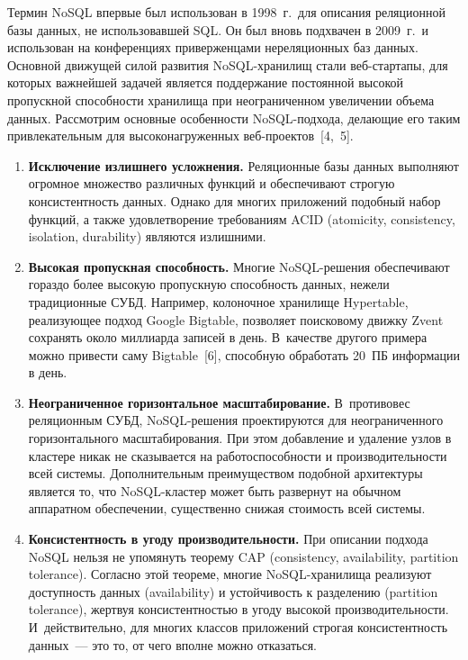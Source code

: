 \begin{multicols}{2}
   Термин NoSQL впервые был использован в 1998~г.\ для описания 
реляционной базы данных, не использовавшей SQL. Он был вновь подхвачен в 
2009~г.\ и использован на конференциях приверженцами нереляционных баз 
данных. Основной движущей силой развития NoSQL-хра\-ни\-лищ стали 
   веб-стартапы, для которых важнейшей задачей является поддержание 
постоянной высокой пропускной способности хранилища при неограниченном 
увеличении объема данных. Рассмотрим основные особенности 
   NoSQL-под\-хо\-да, делающие его таким привлекательным для 
высоконагруженных веб-про\-ек\-тов~[4,~5].
   \begin{enumerate}[1.]
\item \textbf{Исключение излишнего усложнения.} Реляционные базы 
данных выполняют огромное множество различных функций и 
обеспечивают строгую консистентность данных. Однако для многих 
приложений подобный набор функций, а также удовлетворение требованиям 
ACID (atomicity, consistency, isolation, durability)
являются излишними.
\item \textbf{Высокая пропускная способность.} Многие 
NoSQL-ре\-ше\-ния обеспечивают гораздо более высокую пропускную 
способность данных, нежели традиционные СУБД. Например, колоночное 
хранилище Hypertable, реализующее подход Google Bigtable, позволяет 
поисковому движку Zvent сохранять около миллиарда записей в день. 
В~качестве другого примера можно привести саму Bigtable~[6], способную 
обработать 20~ПБ информации в день.
\item \textbf{Неограниченное горизонтальное масштабирование.} 
В~противовес реляционным СУБД, NoSQL-ре\-ше\-ния проектируются для 
неограниченного горизонтального масштабирования. При этом добавление и 
удаление узлов в кластере никак не сказывается на работоспособности и 
производительности всей системы. Дополнительным преимуществом 
подобной архитектуры является то, что NoSQL-клас\-тер может быть 
развернут на обычном аппаратном обеспечении, существенно снижая 
стоимость всей системы.
\item \textbf{Консистентность в угоду производительности.} При 
описании подхода NoSQL нельзя не упомянуть теорему CAP (consistency,
availability, partition tolerance). Согласно этой 
теореме, многие NoSQL-хра\-ни\-ли\-ща реализуют доступность данных 
(availability) и устойчивость к разделению (partition tolerance), жертвуя 
консистентностью в угоду высокой производительности. И~действительно, 
для многих классов приложений строгая консистентность данных~--- это то, 
от чего вполне можно отказаться.
\end{enumerate}


\end{multicols}
